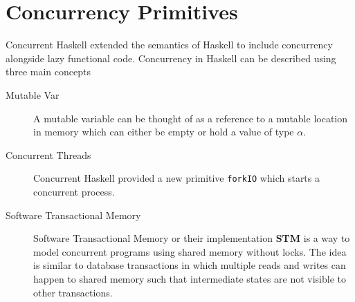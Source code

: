 \section{Concurrency Primitives}
Concurrent Haskell\cite{jones1996concurrent} extended the semantics of Haskell to include concurrency alongside lazy functional code.
Concurrency in Haskell can be described using three main concepts
\begin{description}
\item[Mutable Var] A mutable variable can be thought of as a reference to a mutable location in memory which can either be empty or hold
a value of type \textbf{$\alpha$}.
\item[Concurrent Threads] Concurrent Haskell provided a new primitive \texttt{forkIO} which starts a concurrent process.
\item[Software Transactional Memory] Software Transactional Memory or their implementation \textbf{STM}\cite{harris2005composable}
is a way to model concurrent programs using shared memory without locks. The idea is similar to database transactions in which multiple
reads and writes can happen to shared memory such that intermediate states are not visible to other transactions.
\end{description}


